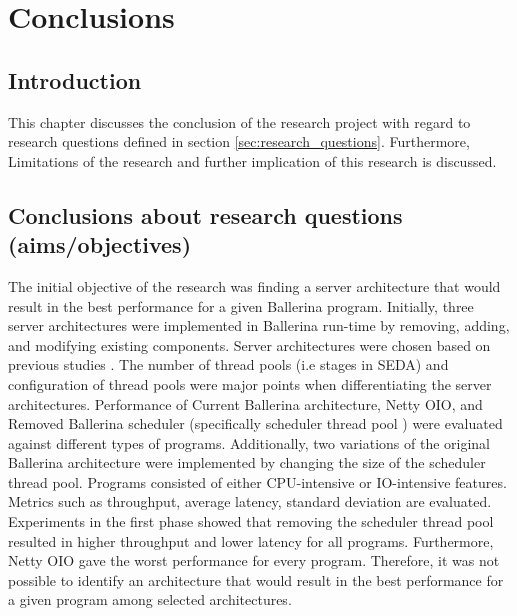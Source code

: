 \chapter{Conclusions}\label{chap:6}

\section{Introduction}

This chapter discusses the conclusion of the research project with regard to research questions defined in section \ref{sec:research_questions}. Furthermore, Limitations of the research and further implication of this research is discussed.

\section{Conclusions about research questions (aims/objectives)}

The initial objective of the research was finding a server architecture that would result in the best performance for a given Ballerina program. Initially, three server architectures were implemented in Ballerina run-time by removing, adding, and modifying existing components. Server architectures were chosen based on previous studies \cite{comparing_high_performance_multi_core,comp_ac,flash_server,seda}. The number of thread pools (i.e stages in SEDA) and configuration of thread pools were major points when differentiating the server architectures. Performance of Current Ballerina architecture, Netty OIO, and Removed Ballerina scheduler (specifically scheduler thread pool ) were evaluated against different types of programs. Additionally, two variations of the original Ballerina architecture were implemented by changing the size of the scheduler thread pool. Programs consisted of either CPU-intensive or IO-intensive features. Metrics such as throughput, average latency, standard deviation are evaluated. Experiments in the first phase showed that removing the scheduler thread pool resulted in higher throughput and lower latency for all programs. Furthermore, Netty OIO gave the worst performance for every program. Therefore, it was not possible to identify an architecture that would result in the best performance for a given program among selected architectures. 



